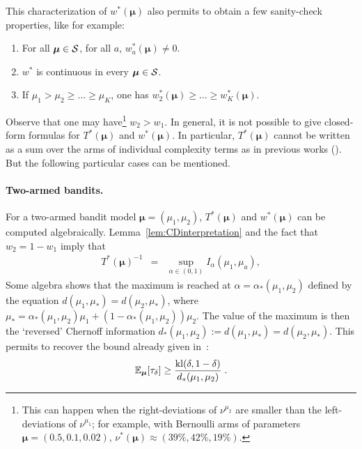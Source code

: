 \documentclass{colt2016} %
\begin{document}
This characterization of $w^*(\bm\mu)$ also permits to obtain a few sanity-check properties, like for example:
\begin{proposition}\label{prop:PropNu}
 \begin{enumerate}
  \item For all $\bm\mu \in \mathcal{S}$, for all $a$, $w_a^*(\bm\mu) \neq 0$. 
  \item $w^*$ is continuous in every $\bm \mu \in \mathcal{S}$. 
  \item If $\mu_1>\mu_2 \geq \dots \geq \mu_K$, one has $w_2^*(\bm \mu) \geq \dots \geq w_K^*(\bm \mu)$.
 \end{enumerate}
\end{proposition}
Observe that one may have\footnote{This can happen when the right-deviations of $\nu^{\mu_2}$ are smaller than the left-deviations of $\nu^{\mu_1}$; for example, with Bernoulli arms of parameters $\bm\mu=(0.5,0.1, 0.02)$, $\nu^*(\bm\mu) \approx(39\%,42\%, 19\%)$.} $w_2>w_1$. In general, it is not possible to give closed-form formulas for $T^*(\bm \mu)$ and $w^*(\bm\mu)$. 
In particular, $T^*(\bm \mu)$ cannot be written as a sum over the arms of individual complexity terms as in previous works (\cite{MannorTsi04,JMLR15}). 
But the following particular cases can be mentioned.

\paragraph{Two-armed bandits.} 
For a two-armed bandit model $\bm \mu=(\mu_1,\mu_2)$, $T^*(\bm\mu)$ and $w^*(\bm \mu)$ can be computed algebraically. 
Lemma~\ref{lem:CDinterpretation} and the fact that $w_2=1-w_1$ imply that 
\begin{eqnarray*}T^*(\bm\mu)^{-1} 
 & = & \sup_{\alpha \in (0,1)} I_{\alpha}(\mu_1,\mu_a),
\end{eqnarray*}
Some algebra shows that the maximum is reached at $\alpha=\alpha_*(\mu_1,\mu_2)$ defined by the equation  $d(\mu_1,\mu_*) = d(\mu_2,\mu_*)$, where $\mu_*=\alpha_*(\mu_1,\mu_2)\mu_1 + (1-\alpha_*(\mu_1,\mu_2))\mu_2$.
The value of the maximum is then the `reversed' Chernoff information
$d_*(\mu_1,\mu_2):=d(\mu_1,\mu_*)=d(\mu_2,\mu_*)$.
This permits to recover the bound already given in~\cite{COLT14}:
\[\mathbb{E}_{\bm \mu}[\tau_\delta] \geq \frac{\mathrm{kl}(\delta, 1-\delta)}{d_*(\mu_1,\mu_2)} \;.\]
\end{document}
